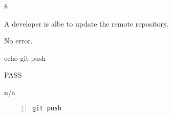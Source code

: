 \begin{description}[align=right,leftmargin=3.2cm,labelindent=3.0cm]
\item[Step:] 8
\item[Confirm:] A developer is albe to update the remote repository.
\item[Expectation:] No error.
\item[Command:] echo git  push
\item[Test Result:] PASS
\item[Evidence:] n/a
\end{description}
\begin{lstlisting}[numbers=left]
git push

\end{lstlisting}
